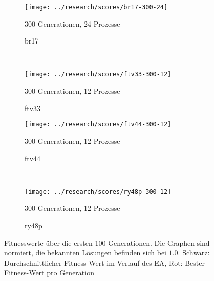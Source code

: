 \begin{figure}[ht]
    \centering
    \begin{subfigure}[b]{0.45\textwidth}
      \texttt{[image: ../research/scores/br17-300-24]}
      \caption{br17}
      \begin{center}
        \vskip-10pt
        \small 300 Generationen, 24 Prozesse
      \end{center}
      \label{fig:br17-300-24}
    \end{subfigure}
    ~
    \begin{subfigure}[b]{0.45\textwidth}
      \texttt{[image: ../research/scores/ftv33-300-12]}
      \caption{ftv33}
      \begin{center}
        \vskip-10pt
        \small 300 Generationen, 12 Prozesse
      \end{center}
      \label{fig:ftv33-300-12}
    \end{subfigure}

    \begin{subfigure}[b]{0.45\textwidth}
      \texttt{[image: ../research/scores/ftv44-300-12]}
      \caption{ftv44}
      \begin{center}
        \vskip-10pt
        \small 300 Generationen, 12 Prozesse
      \end{center}
      \label{fig:ftv44-300-12}
    \end{subfigure}
    ~
    \begin{subfigure}[b]{0.45\textwidth}
      \texttt{[image: ../research/scores/ry48p-300-12]}
      \caption{ry48p}
      \begin{center}
      \vskip-10pt
      \small 300 Generationen, 12 Prozesse
      \end{center}
      \label{fig:ry48p-300-12}
    \end{subfigure}
    \caption[Fitnesswerte einiger ATSP-Probleme]{\label{fig:fitness-plots} 
    Fitnesswerte über die ersten 100 Generationen. Die Graphen sind
    normiert, die bekannten Lösungen befinden sich bei $1.0$. Schwarz:
    Durchschnittlicher Fitness-Wert im Verlauf des EA, Rot: Bester
    Fitness-Wert pro Generation}
\end{figure}
